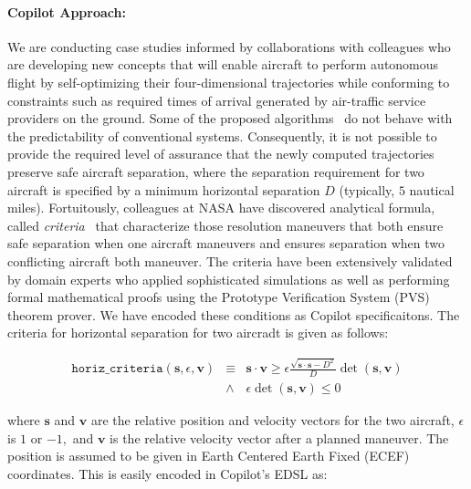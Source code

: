 \paragraph{Copilot Approach:} We are conducting case studies informed
by collaborations with colleagues who are developing new concepts that
will enable aircraft to perform autonomous flight by self-optimizing
their four-dimensional trajectories while conforming to constraints
such as required times of arrival generated by air-traffic service
providers on the ground. Some of the proposed 
algorithms~\cite{KarrVRC} do not  behave with the
predictability of conventional systems.   Consequently, it is not 
possible to provide the required level of assurance that the newly
computed trajectories preserve safe aircraft separation, where the
separation requirement for two aircraft is specified by a minimum
horizontal separation $D$ (typically, $5$ nautical miles).  
Fortuitously, colleagues at NASA have discovered analytical formula,
called \emph{criteria}~\cite{NM2011NASA,NMH14ATIO} that characterize
those resolution maneuvers that both ensure safe separation when one
aircraft maneuvers and ensures separation when two conflicting
aircraft both maneuver. The criteria  have been
extensively validated by domain experts who applied sophisticated
simulations as well as performing formal mathematical proofs using   the Prototype
Verification System (PVS) theorem prover. We have encoded
these conditions as Copilot specificaitons. The criteria for horizontal separation for
two aircradt is given as follows:

\begin{eqnarray*} \texttt{horiz\_criteria}(\bm{s}, \epsilon, \bm{v})
& \equiv &  \bm{s} \cdot \bm{v} \geq \epsilon  \frac{\sqrt{\bm{s} \cdot
  \bm{s}  - D^2}} {D} \operatorname{det}(\bm{s},\bm{v})  \\
& \wedge &  \epsilon \operatorname{det}(\bm{s},\bm{v})  \leq  0 
\end{eqnarray*}

\noindent 
where $\bm{s}$ and $\bm{v}$ are the relative position  and velocity
vectors for the two aircraft, $\epsilon$ is $1$ or $-1,$  and 
$\bm{v}$ is the relative velocity vector after a planned maneuver. 
The position is  assumed to be given in Earth Centered Earth Fixed (ECEF)
coordinates.  This is easily encoded in  Copilot's EDSL as:

